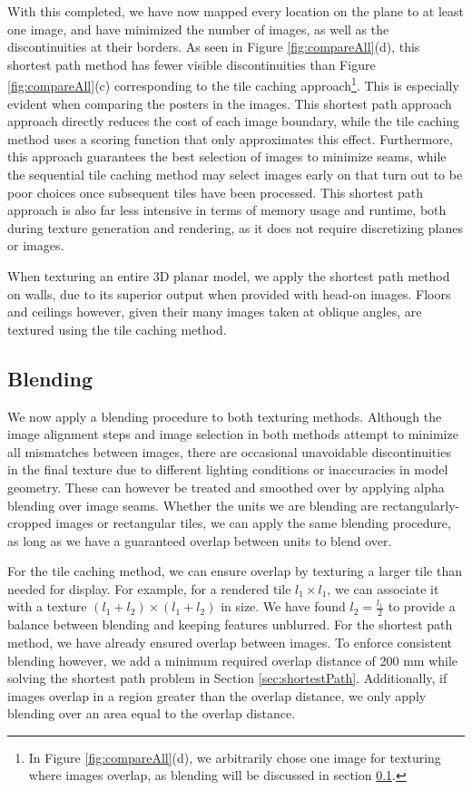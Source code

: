 \documentclass[]{spie}  %
\begin{document}
With this completed, we have now mapped every location on the plane to
at least one image, and have minimized the number of images, as well
as the discontinuities at their borders. As seen in Figure
\ref{fig:compareAll}(d), this shortest path method has fewer visible
discontinuities than Figure \ref{fig:compareAll}(c) corresponding to
the tile caching approach\footnote{In Figure \ref{fig:compareAll}(d),
  we arbitrarily chose one image for texturing where images overlap,
  as blending will be discussed in section \ref{sec:blending}.}. This
is especially evident when comparing the posters in the images. This
shortest path approach approach directly reduces the cost of each
image boundary, while the tile caching method uses a scoring function
that only approximates this effect. Furthermore, this approach
guarantees the best selection of images to minimize seams, while the
sequential tile caching method may select images early on that turn
out to be poor choices once subsequent tiles have been processed. This
shortest path approach is also far less intensive in terms of memory
usage and runtime, both during texture generation and rendering, as it
does not require discretizing planes or images.

When texturing an entire 3D planar model, we apply the shortest path
method on walls, due to its superior output when provided with head-on
images. Floors and ceilings however, given their many images taken at
oblique angles, are textured using the tile caching method.


\subsection{Blending}
\label{sec:blending}
We now apply a blending procedure to both texturing methods. Although
the image alignment steps and image selection in both methods attempt
to minimize all mismatches between images, there are occasional
unavoidable discontinuities in the final texture due to different
lighting conditions or inaccuracies in model geometry. These can
however be treated and smoothed over by applying alpha blending over
image seams.  Whether the units we are blending are
rectangularly-cropped images or rectangular tiles, we can apply the
same blending procedure, as long as we have a guaranteed overlap
between units to blend over.

For the tile caching method, we can ensure overlap by texturing a
larger tile than needed for display. For example, for a rendered tile
$l_1 \times l_1$, we can associate it with a texture $(l_1 + l_2)
\times (l_1 + l_2)$ in size.  We have found $l_2 = \frac{l_1}{2}$ to
provide a balance between blending and keeping features unblurred. For
the shortest path method, we have already ensured overlap between
images. To enforce consistent blending however, we add a minimum
required overlap distance of 200 mm while solving the shortest path
problem in Section \ref{sec:shortestPath}. Additionally, if images
overlap in a region greater than the overlap distance, we only apply
blending over an area equal to the overlap distance.
\end{document}
